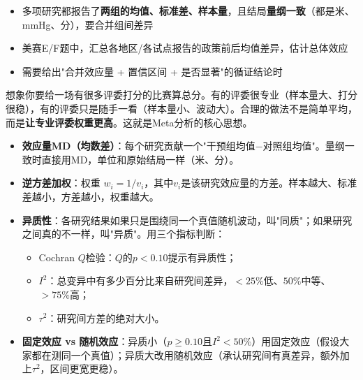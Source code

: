 \begin{algoscene}
\begin{itemize}
    \item 多项研究都报告了\textbf{两组的均值、标准差、样本量}，且结局\textbf{量纲一致}（都是米、mmHg、分），要合并组间差异
    \item 美赛E/F题中，汇总各地区/各试点报告的政策前后均值差异，估计总体效应
    \item 需要给出"合并效应量 + 置信区间 + 是否显著"的循证结论时
\end{itemize}
\end{algoscene}

\begin{algoprinciple}
想象你要给一场有很多评委打分的比赛算总分。有的评委很专业（样本量大、打分很稳），有的评委只是随手一看（样本量小、波动大）。合理的做法不是简单平均，而是\textbf{让专业评委权重更高}。这就是Meta分析的核心思想。

\begin{itemize}
    \item \textbf{效应量MD（均数差）}：每个研究贡献一个"干预组均值$-$对照组均值"。量纲一致时直接用MD，单位和原始结局一样（米、分）。
    \item \textbf{逆方差加权}：权重 $w_i = 1/v_i$，其中$v_i$是该研究效应量的方差。样本越大、标准差越小，方差越小，权重越大。
    \item \textbf{异质性}：各研究结果如果只是围绕同一个真值随机波动，叫"同质"；如果研究之间真的不一样，叫"异质"。用三个指标判断：
    \begin{itemize}
        \item Cochran $Q$检验：$Q$的$p<0.10$提示有异质性；
        \item $I^2$：总变异中有多少百分比来自研究间差异，$<25\%$低、$50\%$中等、$>75\%$高；
        \item $\tau^2$：研究间方差的绝对大小。
    \end{itemize}
    \item \textbf{固定效应 vs 随机效应}：异质小（$p\geq0.10$且$I^2<50\%$）用固定效应（假设大家都在测同一个真值）；异质大改用随机效应（承认研究间有真差异，额外加上$\tau^2$，区间更宽更稳）。
\end{itemize}
\end{algoprinciple}

